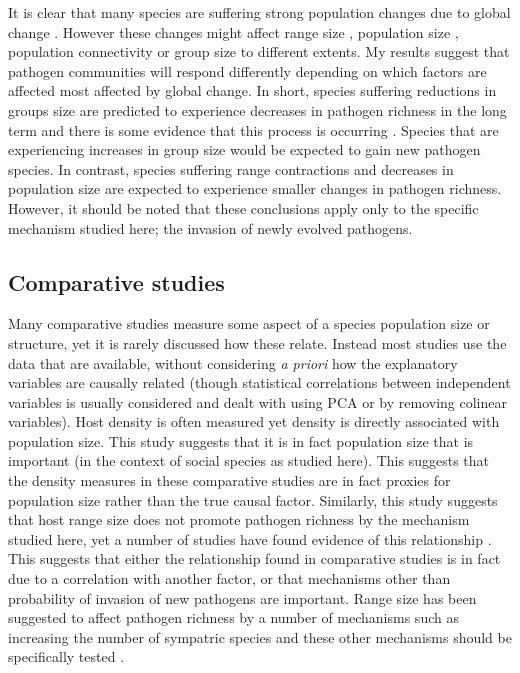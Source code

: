 It is clear that many species are suffering strong population changes due to global change \cite{thomas2004extinction}.
However these changes might affect range size \cite{thomas2004extinction}, population size \cite{craigie2010large}, population connectivity \cite{wasserman2013population, rivera2015habitat, fonturbel2014forest} or group size \cite{lehmann2010apes, zunino2007habitat, manor2003impact, atwood2006influence} to different extents.
My results suggest that pathogen communities will respond differently depending on which factors are affected most affected by global change.
In short, species suffering reductions in groups size \cite{lehmann2010apes, zunino2007habitat, manor2003impact, atwood2006influence} are predicted to experience decreases in pathogen richness in the long term and there is some evidence that this process is occurring \cite{altizer2007threatened, turmelle2009correlates}.
Species that are experiencing increases in group size \cite{lehmann2010apes} would be expected to gain new pathogen species.
In contrast, species suffering range contractions \cite{thomas2004extinction} and decreases in population size \cite{craigie2010large} are expected to experience smaller changes in pathogen richness.
However, it should be noted that these conclusions apply only to the specific mechanism studied here; the invasion of newly evolved pathogens.

\subsection{Comparative studies}

Many comparative studies measure some aspect of a species population size or structure, yet it is rarely discussed how these relate.
Instead most studies use the data that are available, without considering \emph{a priori} how the explanatory variables are causally related (though statistical correlations between independent variables is usually considered and dealt with using PCA or by removing colinear variables).
Host density is often measured \cite{morand1998density, lindenfors2007parasite, nunn2003comparative, arneberg2002host} yet density is directly associated with population size.
This study suggests that it is in fact population size that is important (in the context of social species as studied here).
This suggests that the density measures in these comparative studies are in fact proxies for population size rather than the true causal factor.
Similarly, this study suggests that host range size does not promote pathogen richness by the mechanism studied here, yet a number of studies have found evidence of this relationship \cite{kamiya2014determines, nunn2003comparative}.
This suggests that either the relationship found in comparative studies is in fact due to a correlation with another factor, or that mechanisms other than probability of invasion of new pathogens are important.
Range size has been suggested to affect pathogen richness by a number of mechanisms such as increasing the number of sympatric species and these other mechanisms should be specifically tested \cite{luis2013comparison}.

